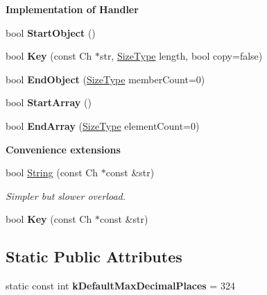 \begin{Indent}{\bf Implementation of Handler}
\begin{DoxyCompactItemize}
\item 
bool {\bfseries Start\+Object} ()\hypertarget{a00335_aec3200b2fc80ec87d1c37f775256b2e1}{}\label{a00335_aec3200b2fc80ec87d1c37f775256b2e1}

\item 
bool {\bfseries Key} (const Ch $\ast$str, \hyperlink{a00677_a5ed6e6e67250fadbd041127e6386dcb5}{Size\+Type} length, bool copy=false)\hypertarget{a00335_a19096d2ccb90761f63ab1240337bf90a}{}\label{a00335_a19096d2ccb90761f63ab1240337bf90a}

\item 
bool {\bfseries End\+Object} (\hyperlink{a00677_a5ed6e6e67250fadbd041127e6386dcb5}{Size\+Type} member\+Count=0)\hypertarget{a00335_a0771a565261564c27676b7300b11f2b5}{}\label{a00335_a0771a565261564c27676b7300b11f2b5}

\item 
bool {\bfseries Start\+Array} ()\hypertarget{a00335_a38715785194b42cd67ba5dd52bf7967e}{}\label{a00335_a38715785194b42cd67ba5dd52bf7967e}

\item 
bool {\bfseries End\+Array} (\hyperlink{a00677_a5ed6e6e67250fadbd041127e6386dcb5}{Size\+Type} element\+Count=0)\hypertarget{a00335_ac88d533095591a878500b63b351d4013}{}\label{a00335_ac88d533095591a878500b63b351d4013}

\end{DoxyCompactItemize}
\end{Indent}
\begin{Indent}{\bf Convenience extensions}\par
\begin{DoxyCompactItemize}
\item 
bool \hyperlink{a00335_a2a2c6f51644b2013471aec4dac0d7466}{String} (const Ch $\ast$const \&str)\hypertarget{a00335_a2a2c6f51644b2013471aec4dac0d7466}{}\label{a00335_a2a2c6f51644b2013471aec4dac0d7466}

\begin{DoxyCompactList}\small\item\em Simpler but slower overload. \end{DoxyCompactList}\item 
bool {\bfseries Key} (const Ch $\ast$const \&str)\hypertarget{a00335_ab6057b7fa9737edb4da55a7afefa966d}{}\label{a00335_ab6057b7fa9737edb4da55a7afefa966d}

\end{DoxyCompactItemize}
\end{Indent}
\subsection*{Static Public Attributes}
\begin{DoxyCompactItemize}
\item 
static const int {\bfseries k\+Default\+Max\+Decimal\+Places} = 324\hypertarget{a00335_ab46d66ae0ca78cb03ab7fb865d129934}{}\label{a00335_ab46d66ae0ca78cb03ab7fb865d129934}

\end{DoxyCompactItemize}
